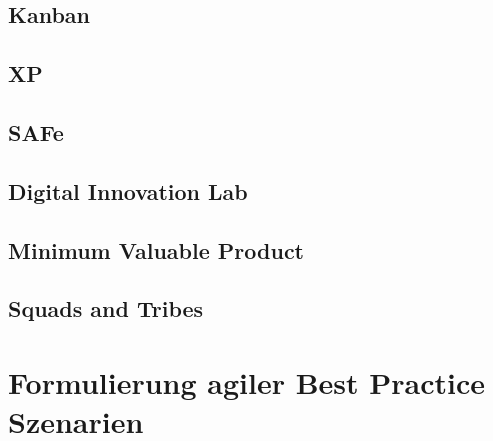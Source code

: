\todots

\subsection{Kanban}

\todots

\subsection{XP}

\todots

\subsection{SAFe}

\todots

\subsection{Digital Innovation Lab}

\todots

\subsection{Minimum Valuable Product}

\todots

\subsection{Squads and Tribes}

\todots


\section{Formulierung agiler Best Practice Szenarien}


\todots


